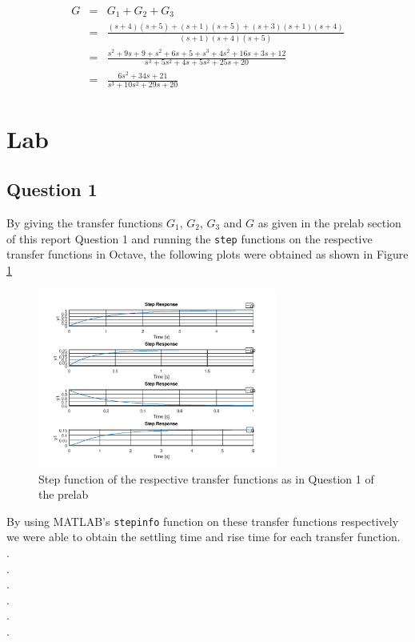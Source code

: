 \documentclass[12pt, a4paper]{article}
\begin{document}
		\begin{equation}
			\begin{array}{rcl}
				G & = & G_1 + G_2 + G_3\\
				  & = & \frac{(s+4)(s+5)+(s+1)(s+5)+(s+3)(s+1)(s+4)}{(s+1)(s+4)(s+5)}\\
				  & = & \frac{s^2+9s+9+s^2+6s+5+s^3+4s^2+16s+3s+12}{s^3+5s^2+4s+5s^2+25s+20}\\
				  & = & \frac{6s^2+34s+21}{s^3+10s^2+29s+20}
			\end{array}
		\end{equation}		
		

		\section{Lab} %
		\label{sec:lab}

		\subsection{Question 1} %
		\label{sub:question_1}
		By giving the transfer functions $G_1$, $G_2$, $G_3$ and $G$ as given in the prelab section of this report Question 1 and running the \texttt{step} functions on the respective transfer functions in Octave, the following plots were obtained as shown in Figure \ref{fig:question_1_lab} 

		\begin{figure}[H]
			\centering
			\includegraphics[width=0.7\textwidth]{Images/question_1_lab.png}
			\caption{Step function of the respective transfer functions as in Question 1 of the prelab}
			\label{fig:question_1_lab} 
		\end{figure}
		
		By using MATLAB's \texttt{stepinfo} function on these transfer functions respectively we were able to obtain the  settling time and rise time for each transfer function. \\
		.\\
		.\\
		.\\
		.\\
		.\\
		.\\
\end{document}
